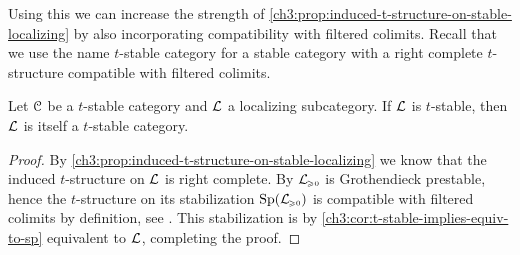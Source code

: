 Using this we can increase the strength of \cref{ch3:prop:induced-t-structure-on-stable-localizing} by also incorporating compatibility with filtered colimits. Recall that we use the name $t$-stable category for a stable category with a right complete $t$-structure compatible with filtered colimits. 

\begin{lemma}
    \label{ch3:lm:localizing-inherits-completeness-and-colimits}
    Let $\EuScript{C}$ be a $t$-stable category and $\mathcal{L}$ a localizing subcategory. If $\mathcal{L}$ is $t$-stable, then $\mathcal{L}$ is itself a $t$-stable category. 
\end{lemma}
\begin{proof}
    By \cref{ch3:prop:induced-t-structure-on-stable-localizing} we know that the induced $t$-structure on $\mathcal{L}$ is right complete. By \cite[C.5.2.1(1)]{lurie_SAG} $\mathcal{L}_{\hspace{-1pt}\scriptscriptstyle\geqslant 0}$ is Grothendieck prestable, hence the $t$-structure on its stabilization $\mathrm{Sp}(\mathcal{L}_{\hspace{-1pt}\scriptscriptstyle\geqslant 0})$ is compatible with filtered colimits by definition, see \cite[C.1.4.1]{lurie_SAG}. This stabilization is by \cref{ch3:cor:t-stable-implies-equiv-to-sp} equivalent to $\mathcal{L}$, completing the proof. 
\end{proof}




